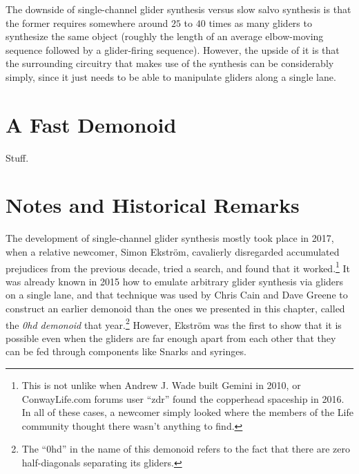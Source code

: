 The downside of single-channel glider synthesis versus slow salvo synthesis is that the former requires somewhere around $25$ to $40$ times as many gliders to synthesize the same object (roughly the length of an average elbow-moving sequence followed by a glider-firing sequence). However, the upside of it is that the surrounding circuitry that makes use of the synthesis can be considerably simply, since it just needs to be able to manipulate gliders along a single lane.


\section{A Fast Demonoid}\label{sec:fast_demonoid}

Stuff.


\section{Notes and Historical Remarks}\label{sec:universal_construction_history}



The development of single-channel glider synthesis mostly took place in 2017, when a relative newcomer, Simon Ekstr{\"o}m, cavalierly disregarded accumulated prejudices from the previous decade, tried a search, and found that it worked.\footnote{This is not unlike when Andrew J. Wade built Gemini in 2010, or ConwayLife.com forums user ``zdr'' found the copperhead spaceship in 2016. In all of these cases, a newcomer simply looked where the members of the Life community thought there wasn't anything to find.} It was already known in 2015 how to emulate arbitrary glider synthesis via gliders on a single lane, and that technique was used by Chris Cain and Dave Greene to construct an earlier demonoid than the ones we presented in this chapter, called the \emph{0hd demonoid} that year.\footnote{The ``0hd'' in the name of this demonoid refers to the fact that there are zero half-diagonals separating its gliders.} However, Ekstr{\"o}m was the first to show that it is possible even when the gliders are far enough apart from each other that they can be fed through components like Snarks and syringes.



